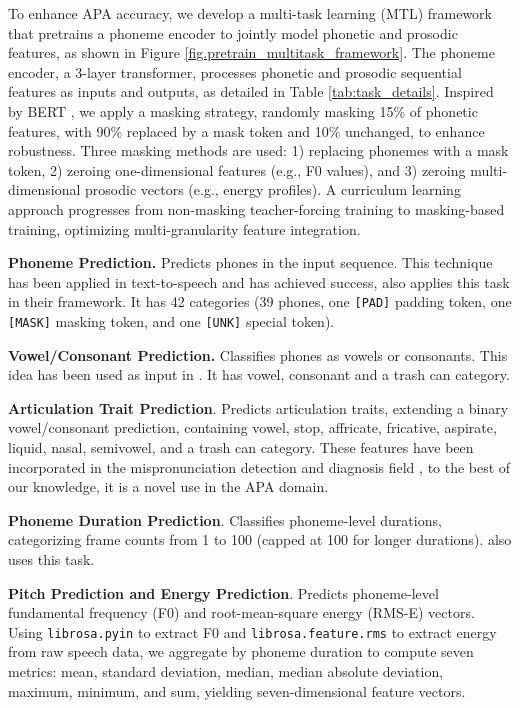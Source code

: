 \documentclass[conference,a4paper]{APSIPA2025}
\begin{document}
To enhance APA accuracy, we develop a multi-task learning (MTL) framework that pretrains a phoneme encoder to jointly model phonetic and prosodic features, as shown in Figure \ref{fig.pretrain_multitask_framework}. The phoneme encoder, a 3-layer transformer, processes phonetic and prosodic sequential features as inputs and outputs, as detailed in Table \ref{tab:task_details}. Inspired by BERT \cite{devlin_etal_2019_bert}, we apply a masking strategy, randomly masking 15\% of phonetic features, with 90\% replaced by a mask token and 10\% unchanged, to enhance robustness. Three masking methods are used: 1) replacing phonemes with a mask token, 2) zeroing one-dimensional features (e.g., F0 values), and 3) zeroing multi-dimensional prosodic vectors (e.g., energy profiles). A curriculum learning approach progresses from non-masking teacher-forcing training to masking-based training, optimizing multi-granularity feature integration.

\noindent \textbf{Phoneme Prediction.} Predicts phones in the input sequence. This technique has been applied in text-to-speech \cite{jia21_interspeech, thenguyen23_interspeech} and has achieved success, \cite{fu23_interspeech} also applies this task in their framework. It has 42 categories (39 phones, one \verb|[PAD]| padding token, one \verb|[MASK]| masking token, and one \verb|[UNK]| special token).

\noindent \textbf{Vowel/Consonant Prediction.} Classifies phones as vowels or consonants. This idea has been used as input in \cite{chao20223m}. It has vowel, consonant and a trash can category.

\noindent \textbf{Articulation Trait Prediction}. Predicts articulation traits, extending a binary vowel/consonant prediction, containing vowel, stop, affricate, fricative, aspirate, liquid, nasal, semivowel, and a trash can category. These features have been incorporated in the mispronunciation detection and diagnosis field \cite{10097226}, to the best of our knowledge, it is a novel use in the APA domain.

\noindent \textbf{Phoneme Duration Prediction}. Classifies phoneme-level durations, categorizing frame counts from 1 to 100 (capped at 100 for longer durations). \cite{fu23_interspeech} also uses this task.

\noindent \textbf{Pitch Prediction and Energy Prediction}. Predicts phoneme-level fundamental frequency (F0) and root-mean-square energy (RMS-E) vectors. Using \verb|librosa.pyin| \cite{mcfee2015librosa, 6853678} to extract F0 and \verb|librosa.feature.rms| to extract energy from raw speech data, we aggregate by phoneme duration to compute seven metrics: mean, standard deviation, median, median absolute deviation, maximum, minimum, and sum, yielding seven-dimensional feature vectors.
\end{document}
